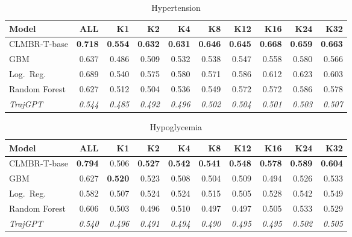 \documentclass{article}
\newcommand{\B}[1]{\textbf{#1}}
\newcommand{\IT}[1]{\textit{#1}}
\begin{document}
\begin{table}[ht]
\centering\caption{Hypertension}
\begin{tabular}{l *{9}{r}}
\toprule
\textbf{Model} & \textbf{ALL} & \textbf{K1} & \textbf{K2} & \textbf{K4} & \textbf{K8} & \textbf{K12} & \textbf{K16} & \textbf{K24} & \textbf{K32} \\
\midrule
CLMBR-T-base  & \B{0.718} & \B{0.554} & \B{0.632} & \B{0.631} & \B{0.646} & \B{0.645} & \B{0.668} & \B{0.659} & \B{0.663} \\
GBM           & 0.637     & 0.486     & 0.509     & 0.532     & 0.538     & 0.547     & 0.558     & 0.580     & 0.566     \\
Log.\ Reg.    & 0.689     & 0.540     & 0.575     & 0.580     & 0.571     & 0.586     & 0.612     & 0.623     & 0.603     \\
Random Forest & 0.627     & 0.512     & 0.504     & 0.536     & 0.549     & 0.572     & 0.572     & 0.586     & 0.578     \\
\IT{TrajGPT}  & \IT{0.544} & \IT{0.485} & \IT{0.492} & \IT{0.496} & \IT{0.502} & \IT{0.504} & \IT{0.501} & \IT{0.503} & \IT{0.507} \\
\bottomrule
\end{tabular}
\end{table}

\begin{table}[ht]
\centering\caption{Hypoglycemia}
\begin{tabular}{l *{9}{r}}
\toprule
\textbf{Model} & \textbf{ALL} & \textbf{K1} & \textbf{K2} & \textbf{K4} & \textbf{K8} & \textbf{K12} & \textbf{K16} & \textbf{K24} & \textbf{K32} \\
\midrule
CLMBR-T-base  & \B{0.794} & 0.506     & \B{0.527} & \B{0.542} & \B{0.541} & \B{0.548} & \B{0.578} & \B{0.589} & \B{0.604} \\
GBM           & 0.627     & \B{0.520} & 0.523     & 0.508     & 0.504     & 0.509     & 0.494     & 0.526     & 0.533     \\
Log.\ Reg.    & 0.582     & 0.507     & 0.524     & 0.524     & 0.515     & 0.505     & 0.528     & 0.542     & 0.549     \\
Random Forest & 0.606     & 0.503     & 0.496     & 0.510     & 0.497     & 0.497     & 0.505     & 0.533     & 0.529     \\
\IT{TrajGPT}  & \IT{0.540} & \IT{0.496} & \IT{0.491} & \IT{0.494} & \IT{0.490} & \IT{0.495} & \IT{0.495} & \IT{0.502} & \IT{0.505} \\
\bottomrule
\end{tabular}
\end{table}
\end{document}
